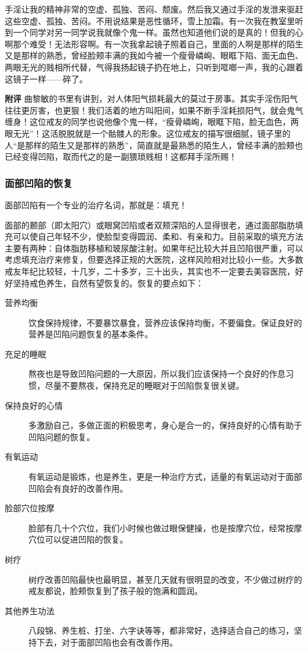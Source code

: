 \begin{case}[面部凹陷]
    手淫让我的精神非常的空虚、孤独、苦闷、颓废。然后我又通过手淫的发泄来驱赶这些空虚、孤独、苦闷。不用说结果是恶性循环，雪上加霜。有一次我在教室里听到一个同学对另一同学说我就像个鬼一样。虽然也知道他们说的是真的！但我的心啊那个难受！无法形容啊。有一次我拿起镜子照着自己，里面的人啊是那样的陌生又是那样的熟悉，曾经脸颊丰满的我如今被一个瘦骨嶙峋、眼眶下陷、面无血色、两眼无光的贱相所代替，气得我扬起镜子扔在地上，只听到哐啷一声，我的心跟着这镜子一样——碎了。

    \textbf{附评} 曲黎敏的书里有讲到，对人体阳气损耗最大的莫过于房事。其实手淫伤阳气往往更厉害，也更狠！我们活着的地方叫阳间，如果不断手淫耗损阳气，就会鬼气缠身！这位戒友的同学也说他像个鬼一样，“瘦骨嶙峋，眼眶下陷，脸无血色，两眼无光”！这活脱脱就是一个骷髅人的形象。这位戒友的描写很细腻，镜子里的人“是那样的陌生又是那样的熟悉”，简直就是最熟悉的陌生人，曾经丰满的脸颊也已经变得凹陷，取而代之的是一副猥琐贱相！这都拜手淫所赐！
\end{case}

\subsubsection{面部凹陷的恢复}

面部凹陷有一个专业的治疗名词，那就是：填充！

面部的颞部（即太阳穴）或眼窝凹陷或者双颊深陷的人显得很老，通过面部脂肪填充可以使自己年轻不少，使脸型变得圆润、柔和、有亲和力。目前采取的填充方法主要有两种：自体脂肪移植和玻尿酸注射。如果年纪比较大并且凹陷很严重，可以考虑填充治疗来修复，但要选择正规的大医院，这样风险相对比较小一些。大多数戒友年纪比较轻，十几岁，二十多岁，三十出头，其实也不一定要去美容医院，好好坚持戒色养生，自然有望恢复的。恢复的要点如下：

\begin{description}
    \item[营养均衡] 饮食保持规律，不要暴饮暴食，营养应该保持均衡，不要偏食。保证良好的营养是凹陷问题恢复的基本条件。
    \item[充足的睡眠] 熬夜也是导致凹陷问题的一大原因，所以我们应该保持一个良好的作息习惯，尽量不要熬夜，保持充足的睡眠对于凹陷恢复很关键。
    \item[保持良好的心情] 多激励自己，多做正面的积极思考，身心是合一的，保持良好的心情有助于凹陷问题的恢复。
    \item[有氧运动] 有氧运动是锻炼，也是养生，更是一种治疗方式，适量的有氧运动对于面部凹陷会有良好的改善作用。
    \item[脸部穴位按摩] 脸部有几十个穴位，我们小时候也做过眼保健操，也是按摩穴位，经常按摩穴位可以促进凹陷的恢复。
    \item[树疗] 树疗改善凹陷最快也最明显，甚至几天就有很明显的改变，不少做过树疗的戒友都说，脸颊恢复到了孩子般的饱满和圆润。
    \item[其他养生功法] 八段锦、养生桩、打坐、六字诀等等，都非常好，选择适合自己的练习，坚持下去，对于面部凹陷也会有改善作用。
\end{description}

